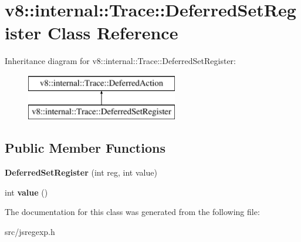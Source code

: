 \hypertarget{classv8_1_1internal_1_1_trace_1_1_deferred_set_register}{}\section{v8\+:\+:internal\+:\+:Trace\+:\+:Deferred\+Set\+Register Class Reference}
\label{classv8_1_1internal_1_1_trace_1_1_deferred_set_register}
Inheritance diagram for v8\+:\+:internal\+:\+:Trace\+:\+:Deferred\+Set\+Register\+:\begin{figure}[H]
\begin{center}
\leavevmode
\includegraphics[height=2.000000cm]{classv8_1_1internal_1_1_trace_1_1_deferred_set_register}
\end{center}
\end{figure}
\subsection*{Public Member Functions}
\begin{DoxyCompactItemize}
\item 
\hypertarget{classv8_1_1internal_1_1_trace_1_1_deferred_set_register_a04d1c5f24542781c0fb02301b52a3643}{}{\bfseries Deferred\+Set\+Register} (int reg, int value)\label{classv8_1_1internal_1_1_trace_1_1_deferred_set_register_a04d1c5f24542781c0fb02301b52a3643}

\item 
\hypertarget{classv8_1_1internal_1_1_trace_1_1_deferred_set_register_ac96ce7953b4e0299586de0dcbc674fc6}{}int {\bfseries value} ()\label{classv8_1_1internal_1_1_trace_1_1_deferred_set_register_ac96ce7953b4e0299586de0dcbc674fc6}

\end{DoxyCompactItemize}


The documentation for this class was generated from the following file\+:\begin{DoxyCompactItemize}
\item 
src/jsregexp.\+h\end{DoxyCompactItemize}
